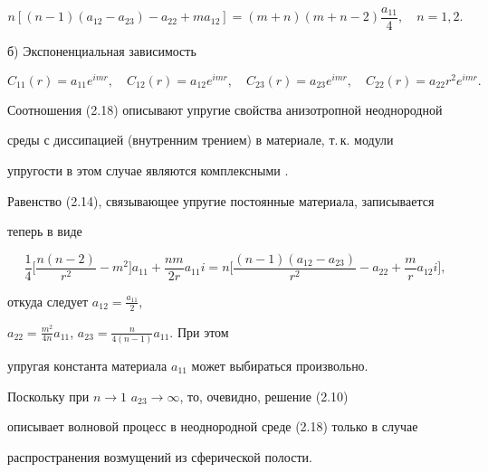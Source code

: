 \begin{equation} 


n[(n-1)(a_{12}-a_{23})-a_{22}+m a_{12}]= 


(m+n)(m+n-2)\frac{a_{11}}{4},\quad n=1,2. 


\end{equation} 


 


б) Экспоненциальная зависимость 


\begin{equation} 


C_{11}(r)=a_{11}e^{imr},\quad C_{12}(r)=a_{12}e^{imr},\quad 


C_{23}(r)=a_{23}e^{imr},\quad C_{22}(r)=a_{22}r^2e^{imr}. 


\end{equation} 


Соотношения (2.18) описывают упругие свойства анизотропной неоднородной 


среды с диссипацией (внутренним трением) в материале, т.\,к. модули 


упругости в этом случае являются комплексными \cite{14}. 


 


Равенство (2.14), связывающее упругие постоянные материала, записывается 


теперь в виде 


$$ 


\frac{1}{4}\biggl[\frac{n(n-2)}{r^2}-m^2\biggr]a_{11}+ 


\frac{nm}{2r}a_{11}i=n 


\biggl[\frac{(n-1)(a_{12}-a_{23})}{r^2}-a_{22}+\frac{m}{r} 


a_{12}i\biggr], 


$$ 


откуда следует $a_{12}=\frac{a_{11}}{2}$, 


$a_{22}=\frac{m^2}{4n}a_{11}$, $a_{23}=\frac{n}{4(n-1)}a_{11}$. При этом 


упругая константа материала $a_{11}$ может выбираться произвольно. 


Поскольку при $n\to 1$\; $a_{23}\to\infty$, то, очевидно, решение (2.10) 


описывает волновой процесс в неоднородной среде (2.18) только в случае 


распространения возмущений из сферической полости. 


